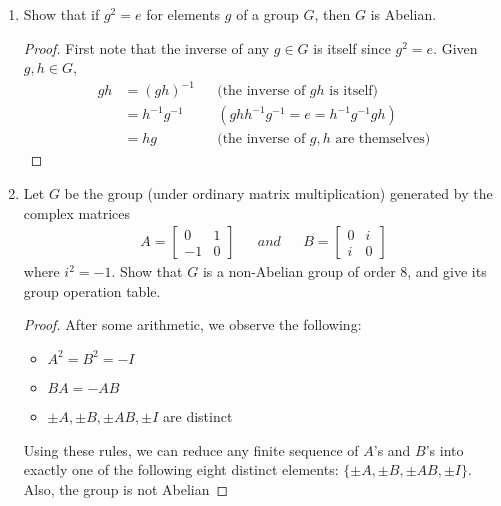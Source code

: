 \documentclass{article}
\begin{document}
\begin{enumerate}
\begin{enumerate}
\begin{proof}
          It remains to prove that the group is infinite. The set
          $\{[1/n]:n\in\mathbb{Z}^+\}$ are unique elements of
          $\mathbb{Q}/\mathbb{Z}$ since $1/m-1/n/notin\mathbb{Z}$ for any
          $m\neq n\in\mathbb{Z}^+$.
        \end{proof}
    \end{enumerate}
  \item Show that if $g^2=e$ for elements $g$ of a group $G$, then $G$ is
    Abelian.
    \begin{proof}
      First note that the inverse of any $g\in G$ is itself since $g^2=e$.
      Given $g,h\in G$,
      \begin{align*}
        gh  & = (gh)^{-1}     && \text{(the inverse of $gh$ is itself)} \\
            & = h^{-1}g^{-1}  && (ghh^{-1}g^{-1}=e=h^{-1}g^{-1}gh) \\
            & = hg            && \text{(the inverse of $g,h$ are themselves)}
      \end{align*}
    \end{proof}
  \item Let $G$ be the group (under ordinary matrix multiplication)
    generated by the complex matrices \label{part_3}
    \begin{align*}
      A =
        \begin{bmatrix}
          0   & 1 \\
          -1  & 0
        \end{bmatrix}
        && and &&
      B =
        \begin{bmatrix}
          0   & i \\
          i   & 0
        \end{bmatrix}
    \end{align*}
    where $i^2=-1$. Show that $G$ is a non-Abelian group of order 8, and
    give its group operation table.
    \begin{proof}
      After some arithmetic, we observe the following:
      \begin{itemize}
        \item $A^2=B^2=-I$
        \item $BA=-AB$
        \item $\pm A, \pm B, \pm AB, \pm I$ are distinct 
      \end{itemize}
      Using these rules, we can reduce any finite sequence of $A$'s and
      $B$'s into exactly one of the following eight distinct elements:
      $\{\pm A, \pm B, \pm AB, \pm I\}$. Also, the group is not Abelian

\end{proof}
\end{enumerate}
\end{document}
